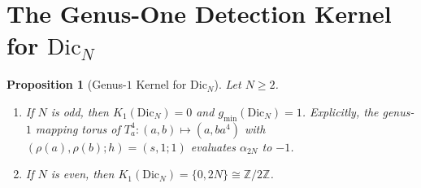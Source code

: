 \documentclass[11pt]{amsart}
\newtheorem{proposition}[theorem]{Proposition}
\theoremstyle{definition}
\theoremstyle{remark}
\newcommand{\Z}{\mathbb{Z}}
\newcommand{\Dic}{\mathrm{Dic}}
\begin{document}
\section{The Genus-One Detection Kernel for $\Dic_N$}

\begin{proposition}[Genus-$1$ Kernel for $\Dic_N$]\label{prop:genus1}
Let $N \ge 2$.
\begin{enumerate}
    \item If $N$ is odd, then $K_1(\Dic_N)=0$ and $g_{\min}(\Dic_N)=1$. Explicitly, the genus-$1$ mapping torus of $T_a^4\colon (a,b)\mapsto (a,ba^4)$ with $(\rho(a),\rho(b);h)=(s,1;1)$ evaluates $\alpha_{2N}$ to $-1$.
    \item If $N$ is even, then $K_1(\Dic_N) = \{0, 2N\} \cong \Z/2\Z$.
\end{enumerate}
\end{proposition}
\end{document}
